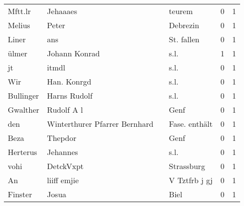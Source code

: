 \documentclass[10pt,a4paper,landscape]{article}
\begin{document}
\begin{longtable}{llllrr}
                  Mftt.lr &                           Jehaaaes &             &                                      teurem &          0 &         1 \\
                   Melius &                              Peter &             &                                    Debrezin &          0 &         1 \\
                    Liner &                                ans &             &                                  St. fallen &          0 &         1 \\
                    ülmer &                      Johann Konrad &             &                                        s.l. &          1 &         1 \\
                       jt &                              itmdl &             &                                        s.l. &          0 &         1 \\
                      Wir &                        Han. Konrgd &             &                                        s.l. &          0 &         1 \\
                Bullinger &                       Harns Rudolf &             &                                        s.l. &          0 &         1 \\
                 Gwalther &                         Rudolf A l &             &                                        Genf &          0 &         1 \\
                      den &      Winterthurer Pfarrer Bernhard &             &                               Fase. enthält &          0 &         1 \\
                     Beza &                            Thepdor &             &                                        Genf &          0 &         1 \\
                 Herterus &                           Jehannes &             &                                        s.l. &          0 &         1 \\
                     vohi &                          DetckVxpt &             &                                  Strassburg &          0 &         1 \\
                       An &                        liiff emjie &             &                               V Tztfrb j gj &          0 &         1 \\
                  Finster &                              Josua &             &                                        Biel &          0 &         1 \\

\end{longtable}
\end{document}
